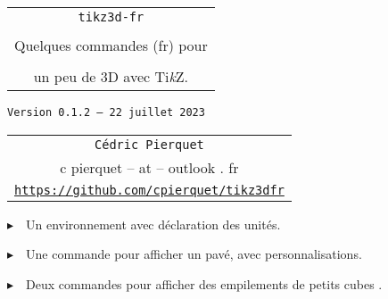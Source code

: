 \documentclass[french,a4paper,11pt]{article}
\def\TPversion{0.1.2}
\def\TPdate{22 juillet 2023}
\providecommand\tikzlogo{Ti\textit{k}Z}
\let\TikZ\tikzlogo
\begin{document}
\setlength{\aweboxleftmargin}{0.07\linewidth}
\setlength{\aweboxcontentwidth}{0.93\linewidth}
\setlength{\aweboxvskip}{8pt}

\pagestyle{fancy}

\thispagestyle{empty}

\vspace{2cm}

\begin{center}
	\begin{minipage}{0.75\linewidth}
	\begin{tcolorbox}[colframe=yellow,colback=yellow!15]
		\begin{center}
			\begin{tabular}{c}
				{\Huge \texttt{tikz3d-fr}}\\
				\\
				{\LARGE Quelques commandes (fr) pour} \\
				\\
				{\LARGE un peu de 3D avec \TikZ.} \\
			\end{tabular}
			
			\bigskip
			
			{\small \texttt{Version \TPversion{} -- \TPdate}}
		\end{center}
	\end{tcolorbox}
\end{minipage}
\end{center}

\begin{center}
	\begin{tabular}{c}
	\texttt{Cédric Pierquet}\\
	{\ttfamily c pierquet -- at -- outlook . fr}\\
	\texttt{\url{https://github.com/cpierquet/tikz3dfr}}
\end{tabular}
\end{center}

\vspace{0.25cm}

{$\blacktriangleright$~~Un environnement avec déclaration des unités.}

\smallskip

{$\blacktriangleright$~~Une commande pour afficher un pavé, avec personnalisations.}

\smallskip

{$\blacktriangleright$~~Deux commandes pour afficher des empilements de \og petits cubes \fg.}

\vspace{1cm}
\end{document}
